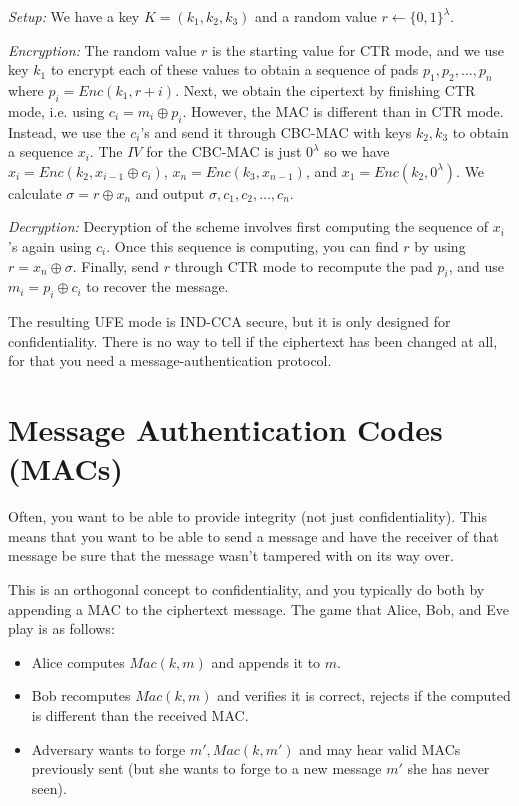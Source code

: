 \documentclass[psamsfonts]{amsart}
\begin{document}
\emph{Setup:} We have a key $K = (k_1, k_2, k_3)$ and a random value $r \leftarrow \{0,1\}^\lambda$. 

\emph{Encryption:} The random value $r$ is the starting value for CTR mode, and we use key $k_1$ to encrypt each of these values to obtain a sequence of pads $p_1, p_2, \ldots, p_n$ where $p_i = Enc(k_1, r+i)$. Next, we obtain the cipertext by finishing CTR mode, i.e. using $c_i = m_i \oplus p_i$. However, the MAC is different than in CTR mode. Instead, we use the $c_i$'s and send it through CBC-MAC with keys $k_2, k_3$ to obtain a sequence $x_i$. The $IV$ for the CBC-MAC is just $0^{\lambda}$ so we have $x_i = Enc(k_2, x_{i-1} \oplus c_i)$, $x_n = Enc(k_3, x_{n-1})$, and $x_1 = Enc(k_2, 0^{\lambda})$. We calculate $\sigma = r \oplus x_n$ and output $\sigma, c_1, c_2, \ldots, c_n$.

\emph{Decryption:} Decryption of the scheme involves first computing the sequence of $x_i$'s again using $c_i$. Once this sequence is computing, you can find $r$ by using $r = x_n \oplus \sigma$. Finally, send $r$ through CTR mode to recompute the pad $p_i$, and use $m_i = p_i \oplus c_i$ to recover the message.

The resulting UFE mode is IND-CCA secure, but it is only designed for confidentiality. There is no way to tell if the ciphertext has been changed at all, for that you need a message-authentication protocol.

\newpage

\section{Message Authentication Codes (MACs)}

Often, you want to be able to provide integrity (not just confidentiality). This means that you want to be able to send a message and have the receiver of that message be sure that the message wasn't tampered with on its way over.

This is an orthogonal concept to confidentiality, and you typically do both by appending a MAC to the ciphertext message. The game that Alice, Bob, and Eve play is as follows:

\begin{itemize}
  \item Alice computes $Mac(k, m)$ and appends it to $m$.
  \item Bob recomputes $Mac(k, m)$ and verifies it is correct, rejects if the computed is different than the received MAC.
  \item Adversary wants to forge $m', Mac(k, m')$ and may hear valid MACs previously sent (but she wants to forge to a new message $m'$ she has never seen).
\end{itemize}
\end{document}
